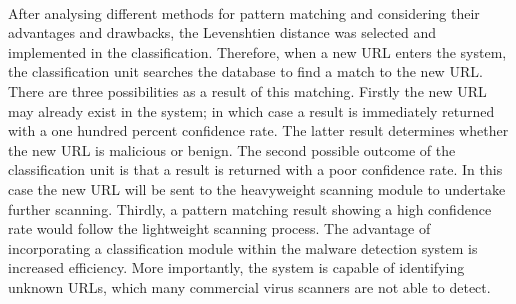 \paragraph{} 
After analysing different methods for pattern matching and considering their advantages and drawbacks, the Levenshtien distance was selected and implemented in the classification.  Therefore, when a new URL enters the system, the classification unit searches the database to find a match to the new URL. There are three possibilities as a result of this matching. Firstly the new URL may already exist in the system; in which case a result is immediately returned with a one hundred percent confidence rate. The latter result determines whether the new URL is malicious or benign. The second possible outcome of the classification unit is that a result is returned with a poor confidence rate. In this case the new URL will be sent to the heavyweight scanning module to undertake further scanning. Thirdly, a pattern matching result showing a high confidence rate would follow the lightweight scanning process.
The advantage of incorporating a classification module within the malware detection system is increased efficiency. More importantly, the system is capable of identifying unknown URLs, which many commercial virus scanners are not able to detect. 
